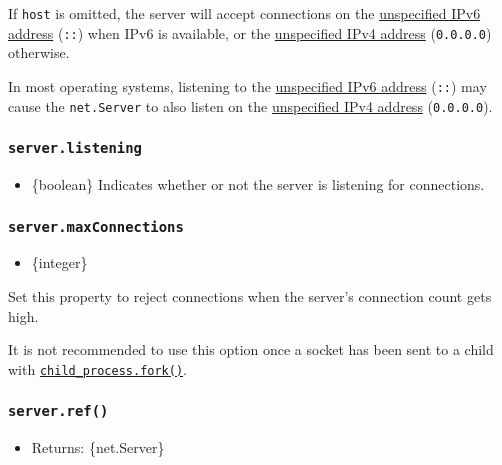 If \texttt{host} is omitted, the server will accept connections on the
\href{https://en.wikipedia.org/wiki/IPv6_address\#Unspecified_address}{unspecified
IPv6 address} (\texttt{::}) when IPv6 is available, or the
\href{https://en.wikipedia.org/wiki/0.0.0.0}{unspecified IPv4 address}
(\texttt{0.0.0.0}) otherwise.

In most operating systems, listening to the
\href{https://en.wikipedia.org/wiki/IPv6_address\#Unspecified_address}{unspecified
IPv6 address} (\texttt{::}) may cause the \texttt{net.Server} to also
listen on the \href{https://en.wikipedia.org/wiki/0.0.0.0}{unspecified
IPv4 address} (\texttt{0.0.0.0}).

\subsubsection{\texorpdfstring{\texttt{server.listening}}{server.listening}}\label{server.listening}

\begin{itemize}
\tightlist
\item
  \{boolean\} Indicates whether or not the server is listening for
  connections.
\end{itemize}

\subsubsection{\texorpdfstring{\texttt{server.maxConnections}}{server.maxConnections}}\label{server.maxconnections}

\begin{itemize}
\tightlist
\item
  \{integer\}
\end{itemize}

Set this property to reject connections when the server's connection
count gets high.

It is not recommended to use this option once a socket has been sent to
a child with
\href{child_process.md\#child_processforkmodulepath-args-options}{\texttt{child\_process.fork()}}.

\subsubsection{\texorpdfstring{\texttt{server.ref()}}{server.ref()}}\label{server.ref}

\begin{itemize}
\tightlist
\item
  Returns: \{net.Server\}
\end{itemize}

